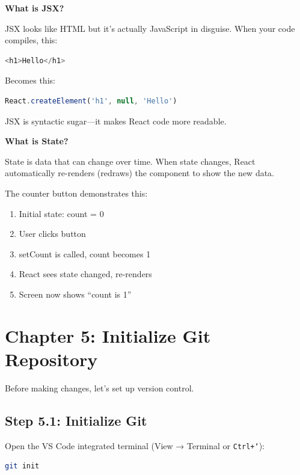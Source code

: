 \documentclass[12pt,a4paper]{article}
\begin{document}
\begin{concept}
\textbf{What is JSX?}

JSX looks like HTML but it's actually JavaScript in disguise. When your code compiles, this:
\begin{lstlisting}[language=JavaScript]
<h1>Hello</h1>
\end{lstlisting}
Becomes this:
\begin{lstlisting}[language=JavaScript]
React.createElement('h1', null, 'Hello')
\end{lstlisting}
JSX is syntactic sugar---it makes React code more readable.
\end{concept}

\begin{concept}
\textbf{What is State?}

State is data that can change over time. When state changes, React automatically re-renders (redraws) the component to show the new data.

The counter button demonstrates this:
\begin{enumerate}
    \item Initial state: count = 0
    \item User clicks button
    \item setCount is called, count becomes 1
    \item React sees state changed, re-renders
    \item Screen now shows ``count is 1''
\end{enumerate}
\end{concept}

\section{Chapter 5: Initialize Git Repository}

Before making changes, let's set up version control.

\subsection{Step 5.1: Initialize Git}

Open the VS Code integrated terminal (View → Terminal or \texttt{Ctrl+`}):

\begin{lstlisting}[language=bash,caption={Initialize Git repository}]
git init
\end{lstlisting}
\end{document}

